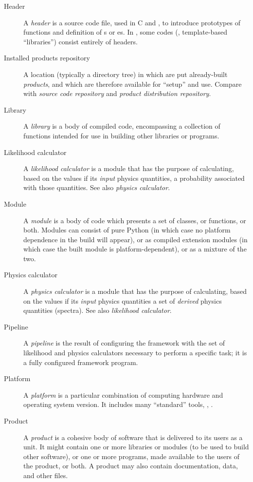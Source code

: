 \documentclass[draftmode,draftwater]{memarticle}
\begin{document}
\begin{description}
\item[Header] A \emph{header} is a source code file, used in C and \cpp,
  to introduce prototypes of functions and definition of s
  or es. In \cpp, some codes (\eg, template-based
  ``libraries'') consist entirely of headers.

\item[Installed products repository] A location (typically a directory
  tree) in which are put already-built \emph{products}, and which are
  therefore available for ``setup'' and use. Compare with \emph{source
    code repository} and \emph{product distribution repository}.

\item[Library] A \emph{library} is a body of compiled code, encompassing
  a collection of functions intended for use in building other libraries
  or programs.

\item[Likelihood calculator] A \emph{likelihood calculator} is a module
  that has the purpose of calculating, based on the values if its
  \emph{input} physics quantities, a probability associated with those
  quantities. See also \emph{physics calculator}.

\item[Module] A \emph{module} is a body of code which presents a set of
  classes, or functions, or both. Modules can consist of pure Python (in
  which case no platform dependence in the build will appear), or as
  compiled extension modules (in which case the built module is
  platform-dependent), or as a mixture of the two.

\item[Physics calculator] A \emph{physics calculator} is a module that
  has the purpose of calculating, based on the values if its
  \emph{input} physics quantities a set of \emph{derived} physics
  quantities (\eg spectra). See also \emph{likelihood calculator}.

\item[Pipeline] A \emph{pipeline} is the result of
  configuring the framework with the set of likelihood and physics
  calculators necessary to perform a specific task; it is a fully
  configured framework program.

\item[Platform] A \emph{platform} is a particular combination of
  computing hardware and operating system version. It includes many
  ``standard'' tools, \eg, .

\item[Product] A \emph{product} is a cohesive body of software that is
  delivered to its users as a unit. It might contain one or more
  libraries or modules (to be used to build other software), or one or
  more programs, made available to the users of the product, or both. A
  product may also contain documentation, data, and other files.


\end{description}
\end{document}
